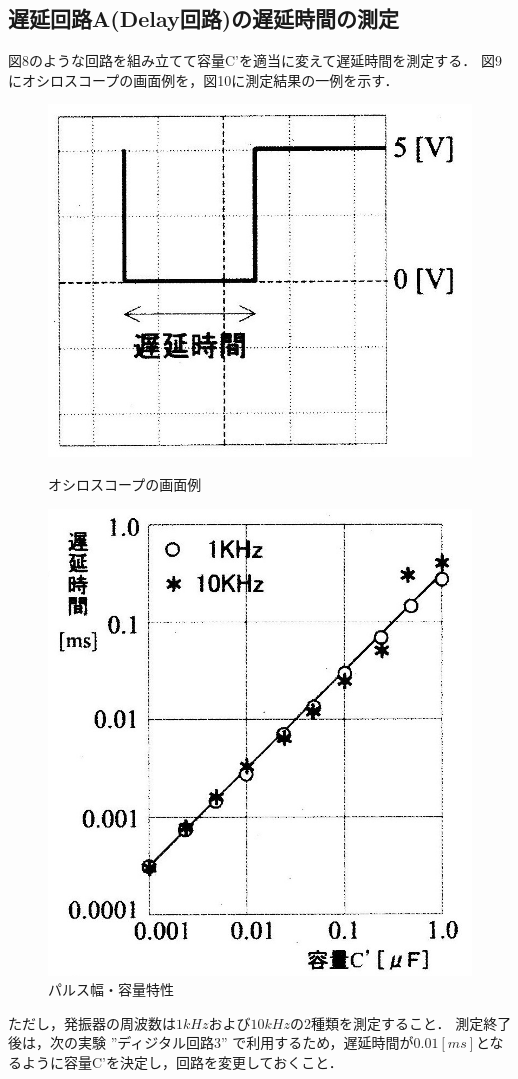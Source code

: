 \documentclass[10pt, a4j, dvipdfmx]{jarticle}
\begin{document}
\subsection{遅延回路A(Delay回路)の遅延時間の測定}
図8のような回路を組み立てて容量C'を適当に変えて遅延時間を測定する．
図9にオシロスコープの画面例を，図10に測定結果の一例を示す．
\begin{figure}[H]
  \begin{minipage}{0.5\hsize}
    \centering
   	\includegraphics[width=0.7\hsize]{images/text/fig9.png}
    \caption{オシロスコープの画面例}
  \end{minipage}
  \begin{minipage}{0.5\hsize}
    \centering
	\includegraphics[width=0.7\hsize]{images/text/fig10.png}
    \caption{パルス幅・容量特性}
  \end{minipage}
\end{figure}
ただし，発振器の周波数は$1kHz$および$10kHz$の2種類を測定すること．
測定終了後は，次の実験 ''ディジタル回路3'' で利用するため，遅延時間が$0.01[ms]$となるように容量C'を決定し，回路を変更しておくこと．
\end{document}

